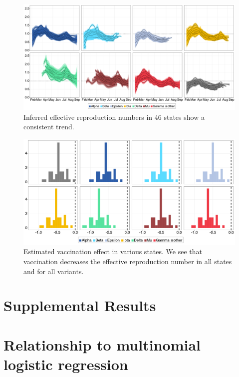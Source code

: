 \documentclass[12pt]{article}
\begin{document}
\begin{figure}
  \centering
  \includegraphics[width=0.8\linewidth]{figs/fig_4_rt_consensus.png}
  \caption{Inferred effective reproduction numbers in 46 states show a consistent trend.}%
  \label{fig:4}
\end{figure}

\begin{figure}
  \centering
  \includegraphics[width=0.8\linewidth]{figs/fig_5_vaccination_effect.png}
  \caption{Estimated vaccination effect in various states. 
  We see that vaccination decreases the effective reproduction number in all states and for all variants.}%
  \label{fig:5}
\end{figure}




\newpage
\appendix

\section*{Supplemental Results}

\section{Relationship to multinomial logistic regression}
\end{document}
